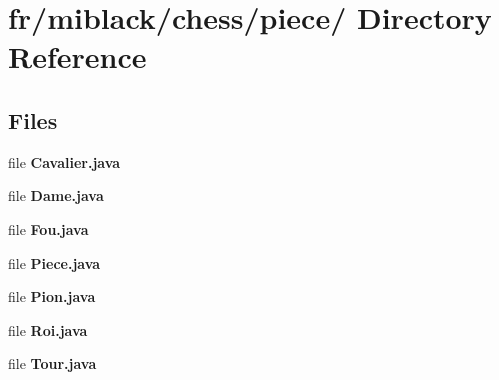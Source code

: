 \section{fr/miblack/chess/piece/ Directory Reference}
\label{dir_00968005b59e10d4c4e97f82ec8ee4ce}
\subsection*{Files}
\begin{DoxyCompactItemize}
\item 
file {\bfseries Cavalier.\-java}
\item 
file {\bfseries Dame.\-java}
\item 
file {\bfseries Fou.\-java}
\item 
file {\bfseries Piece.\-java}
\item 
file {\bfseries Pion.\-java}
\item 
file {\bfseries Roi.\-java}
\item 
file {\bfseries Tour.\-java}
\end{DoxyCompactItemize}
